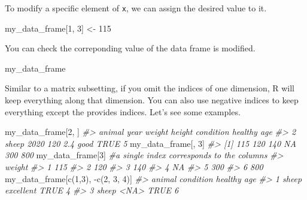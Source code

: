 \documentclass[
]{book}
\newenvironment{Shaded}{\begin{snugshade}}{\end{snugshade}}
\newcommand{\CommentTok}[1]{\textcolor[rgb]{0.56,0.35,0.01}{\textit{#1}}}
\newcommand{\DecValTok}[1]{\textcolor[rgb]{0.00,0.00,0.81}{#1}}
\newcommand{\FunctionTok}[1]{\textcolor[rgb]{0.00,0.00,0.00}{#1}}
\newcommand{\NormalTok}[1]{#1}
\newcommand{\OtherTok}[1]{\textcolor[rgb]{0.56,0.35,0.01}{#1}}
\newcommand{\SpecialCharTok}[1]{\textcolor[rgb]{0.00,0.00,0.00}{#1}}
\begin{document}
To modify a specific element of \texttt{x}, we can assign the desired value to it.

\begin{Shaded}
\begin{Highlighting}[]
\NormalTok{my\_data\_frame[}\DecValTok{1}\NormalTok{, }\DecValTok{3}\NormalTok{] }\OtherTok{\textless{}{-}} \DecValTok{115}
\end{Highlighting}
\end{Shaded}

You can check the correponding value of the data frame is modified.

\begin{Shaded}
\begin{Highlighting}[]
\NormalTok{my\_data\_frame}
\end{Highlighting}
\end{Shaded}

Similar to a matrix subsetting, if you omit the indices of one dimension, R will keep everything along that dimension. You can also use negative indices to keep everything except the provides indices. Let's see some examples.

\begin{Shaded}
\begin{Highlighting}[]
\NormalTok{my\_data\_frame[}\DecValTok{2}\NormalTok{, ]}
\CommentTok{\#\textgreater{}   animal year weight height condition healthy age}
\CommentTok{\#\textgreater{} 2  sheep 2020    120    2.4      good    TRUE   5}
\NormalTok{my\_data\_frame[, }\DecValTok{3}\NormalTok{]}
\CommentTok{\#\textgreater{} [1] 115 120 140  NA 300 800}
\NormalTok{my\_data\_frame[}\DecValTok{3}\NormalTok{]       }\CommentTok{\#a single index corresponds to the columns}
\CommentTok{\#\textgreater{}   weight}
\CommentTok{\#\textgreater{} 1    115}
\CommentTok{\#\textgreater{} 2    120}
\CommentTok{\#\textgreater{} 3    140}
\CommentTok{\#\textgreater{} 4     NA}
\CommentTok{\#\textgreater{} 5    300}
\CommentTok{\#\textgreater{} 6    800}
\NormalTok{my\_data\_frame[}\FunctionTok{c}\NormalTok{(}\DecValTok{1}\NormalTok{,}\DecValTok{3}\NormalTok{), }\SpecialCharTok{{-}}\FunctionTok{c}\NormalTok{(}\DecValTok{2}\NormalTok{, }\DecValTok{3}\NormalTok{, }\DecValTok{4}\NormalTok{)]}
\CommentTok{\#\textgreater{}   animal condition healthy age}
\CommentTok{\#\textgreater{} 1  sheep excellent    TRUE   4}
\CommentTok{\#\textgreater{} 3  sheep      \textless{}NA\textgreater{}    TRUE   6}
\end{Highlighting}
\end{Shaded}
\end{document}
